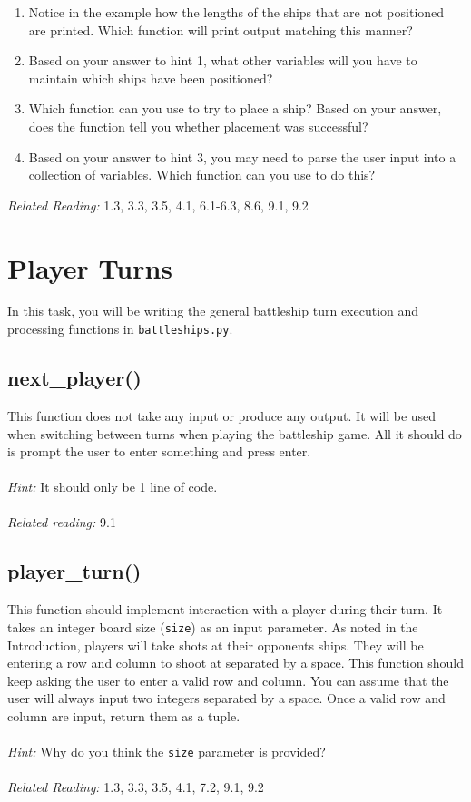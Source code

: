 \documentclass{article}
\begin{document}
\begin{enumerate}
    \item Notice in the example how the lengths of the ships that are not positioned are printed. Which function will print output matching this manner?
    \item Based on your answer to hint 1, what other variables will you have to maintain which ships have been positioned?
    \item Which function can you use to try to place a ship? Based on your answer, does the function tell you whether placement was successful?
    \item Based on your answer to hint 3, you may need to parse the user input into a collection of variables. Which function can you use to do this?
\end{enumerate}
\textit{Related Reading:} 1.3, 3.3, 3.5, 4.1, 6.1-6.3, 8.6, 9.1, 9.2

\section{Player Turns}
In this task, you will be writing the general battleship turn execution and processing functions in \texttt{battleships.py}.

\subsection{next\_player()}
This function does not take any input or produce any output. It will be used when switching between turns when playing the battleship game. All it should do is prompt the user to enter something and press enter.\\\\
\textit{Hint:} It should only be 1 line of code.\\\\
\textit{Related reading:} 9.1

\subsection{player\_turn()}
This function should implement interaction with a player during their turn. It takes an integer board size (\texttt{size}) as an input parameter. As noted in the Introduction, players will take shots at their opponents ships. They will be entering a row and column to shoot at separated by a space. This function should keep asking the user to enter a valid row and column. You can assume that the user will always input two integers separated by a space. Once a valid row and column are input, return them as a tuple.\\\\
\textit{Hint:} Why do you think the \texttt{size} parameter is provided?\\\\
\textit{Related Reading:} 1.3, 3.3, 3.5, 4.1, 7.2, 9.1, 9.2
\end{document}
